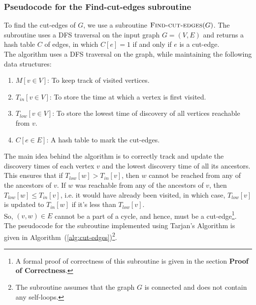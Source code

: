 \documentclass[12pt]{report}
\begin{document}
    \subsubsection*{Pseudocode for the Find-cut-edges subroutine}
    To find the cut-edges of $G$, we use a subroutine $\Call{Find-cut-edges}{G}$.
    The subroutine uses a DFS traversal on the input graph $G = (V, E)$ and returns a hash table $C$ of edges, in which
    $C[e] = 1$ if and only if $e$ is a cut-edge.
    \vspace*{10pt} \\
    The algorithm uses a DFS traversal on the graph, while maintaining the following data structures:
    \begin{enumerate}
        \item $M[v \in V]$: To keep track of visited vertices.
        \item $T_{in}[v \in V]$: To store the time at which a vertex is first visited.
        \item $T_{low}[v \in V]$: To store the lowest time of discovery of all vertices reachable from $v$.
        \item $C[e \in E]$: A hash table to mark the cut-edges.
    \end{enumerate}
    The main idea behind the algorithm is to correctly track and update the discovery times of each vertex $v$ and the lowest discovery time of all its ancestors.
    \vspace*{10pt} \\
    This ensures that if $T_{low}[w] > T_{in}[v]$, then $w$ cannot be reached from any of the ancestors of $v$.
    If $w$ was reachable from any of the ancestors of $v$, then $T_{low}[w] \leq T_{in}[v]$, i.e. it would have already been visited,
    in which case, $T_{low}[v]$ is updated to $T_{in}[w]$ if it's less than $T_{low}[v]$. \\
    So, $(v, w) \in E$ cannot be a part of a cycle, and hence, must be a cut-edge\footnote{
        A formal proof of correctness of this subroutine is given in the section \textbf{Proof of Correctness}.
    }.
    \vspace*{10pt} \\
    The pseudocode for the subroutine implemented using Tarjan's Algorithm is given in Algorithm~(\ref{alg:cut-edges})\footnote{
        The subroutine assumes that the graph $G$ is connected and does not contain any self-loops.
    }.
\end{document}

